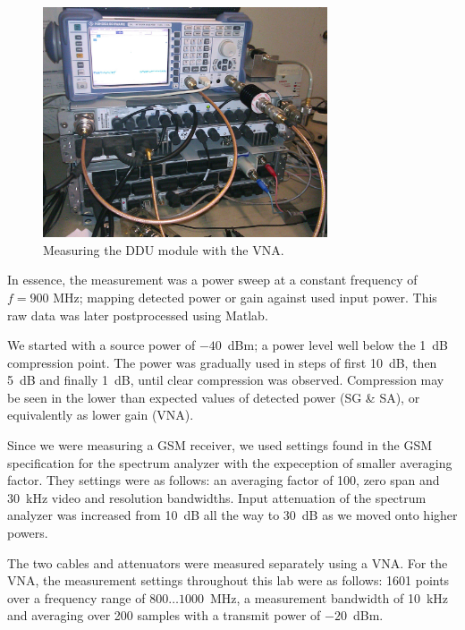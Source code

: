 \documentclass[a4paper, 12pt]{article}
\begin{document}
\begin{figure}[h!]
	\begin{center}
	\includegraphics[width=0.75\textwidth]{img/vna-ddu-vna.jpg}
	\caption{Measuring the DDU module with the VNA.}
	\label{f:vna2}
	\end{center}
	\vspace*{-12pt}
\end{figure}

In essence, the measurement was a power sweep at a constant frequency of 
$f = 900$ MHz; mapping detected power or gain against used input power. 
This raw data was later postprocessed using Matlab.

We started with a source power of $-40$~dBm; a power level well below the 
1~dB compression point. The power was gradually used in steps of first 
10~dB, then 5~dB and finally 1~dB, until clear compression was observed. 
Compression may be seen in the lower than expected values of detected 
power (SG \& SA), or equivalently as lower gain (VNA).

Since we were measuring a GSM receiver, we used settings found in the GSM 
specification for the spectrum analyzer with the expeception of smaller 
averaging factor. They settings were as follows: an averaging factor of 100, 
zero span and 30~kHz video and resolution bandwidths. Input attenuation of the 
spectrum analyzer was increased from 10~dB all the way to 30~dB as we moved onto 
higher powers. 

The two cables and attenuators were measured separately using a VNA. For the VNA, 
the measurement settings throughout this lab were as follows: 1601 points over 
a frequency range of $800 \ldots 1000$~MHz, a measurement bandwidth of 10~kHz 
and averaging over 200 samples with a transmit power of $-20$~dBm.
\end{document}
